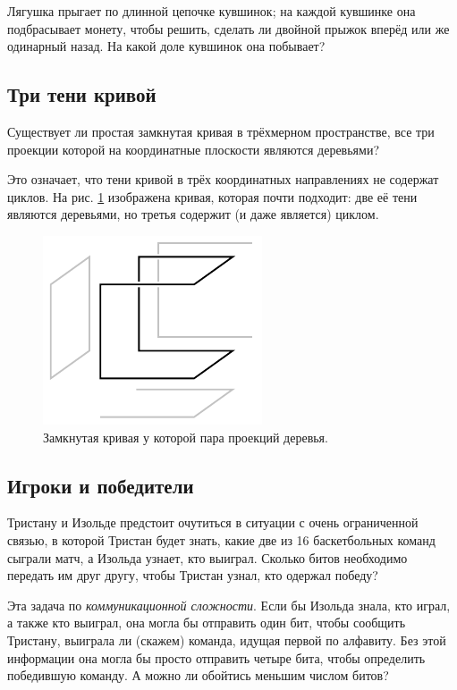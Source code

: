 Лягушка прыгает по длинной цепочке кувшинок;
на каждой кувшинке она подбрасывает монету, чтобы решить,
сделать ли двойной прыжок вперёд или же одинарный назад.
На какой доле кувшинок она побывает?

\subsection*{Три тени кривой}\label{Три тени кривой}

Существует ли простая замкнутая кривая в трёхмерном пространстве, все три проекции которой на координатные плоскости являются деревьями?

Это означает, что тени кривой в трёх координатных направлениях не содержат циклов.
На рис. \ref{pic:proj1} изображена кривая, которая почти подходит: две её тени являются деревьями, но третья содержит (и даже является) циклом.

\begin{figure}[htb!]
\centering
\includegraphics[scale=1]{pics/proj1}
\caption{Замкнутая кривая у которой пара проекций деревья.}
\label{pic:proj1}
\end{figure}

\subsection*{Игроки и победители}

Тристану и Изольде предстоит очутиться в ситуации с очень ограниченной связью, в которой Тристан будет знать, какие две из 16 баскетбольных команд сыграли матч, а Изольда узнает, кто выиграл.
Сколько битов необходимо передать им друг другу, чтобы Тристан узнал, кто одержал победу?

Эта задача по \emph{коммуникационной сложности}.
Если бы Изольда знала, кто играл, а также кто выиграл, она могла бы отправить один бит, чтобы сообщить Тристану, выиграла ли (скажем) команда, идущая первой по алфавиту.
Без этой информации она могла бы просто отправить четыре бита, чтобы определить победившую команду.
А можно ли обойтись меньшим числом битов?

